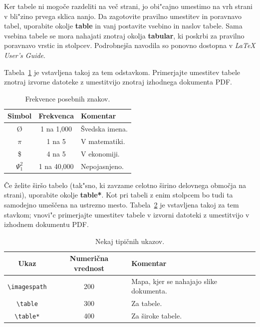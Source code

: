 \documentclass[sigconf]{acmart}
\begin{document}
Ker tabele ni mogoče razdeliti na več strani, jo obi"cajno umestimo na vrh
strani v bli"zino prvega sklica nanjo.  Da zagotovite pravilno umestitev in
poravnavo tabel, uporabite okolje \textbf{table} in vanj postavite vsebino in
naslov tabele.  Sama vsebina tabele se mora nahajati znotraj okolja
\textbf{tabular}, ki poskrbi za pravilno poravnavo vrstic in stolpcev.
Podrobnejša navodila so ponovno dostopna v \emph{\LaTeX{} User's Guide}.
    
Tabela~\ref{tab:table1} je vstavljena takoj za tem odstavkom.  Primerjajte
umestitev tabele znotraj izvorne datoteke z umestitvijo znotraj izhodnega
dokumenta PDF\@.

\begin{table}
    \centering
    \caption{Frekvence posebnih znakov.}
    \label{tab:table1}
    \begin{tabular}{ccl}
        \toprule
        Simbol&Frekvenca&Komentar\\
        \midrule
        \O & 1 na 1,000& Švedska imena.\\
        $\pi$ & 1 na 5& V matematiki.\\
        \$ & 4 na 5 & V ekonomiji.\\
        $\Psi^2_1$ & 1 na 40,000& Nepojasnjeno. \\
        \bottomrule
    \end{tabular}
\end{table}

Če želite širšo tabelo (tak"sno, ki zavzame celotno širino delovnega območja
na strani), uporabite okolje \textbf{table*}.  Kot pri tabeli z enim stolpcem
bo tudi ta samodejno umeščena na ustrezno mesto.  Tabela~\ref{tab:table2} je
vstavljena takoj za tem stavkom; vnovi"c primerjajte umestitev tabele v
izvorni datoteki z umestitvijo v izhodnem dokumentu PDF\@.

\begin{table}
    \centering
    \caption{Nekaj tipičnih ukazov.}
    \label{tab:table2}
    \begin{tabular}{ccl}
        \toprule
        Ukaz&Numerična vrednost&Komentar\\
        \midrule
        \texttt{\textbackslash{}imagespath} & 200 & Mapa, kjer se nahajajo slike dokumenta. \\
        \texttt{\textbackslash{}table} & 300 & Za tabele.\\
        \texttt{\textbackslash{}table*} & 400& Za široke tabele.\\
        \bottomrule
    \end{tabular}
\end{table}
\end{document}
